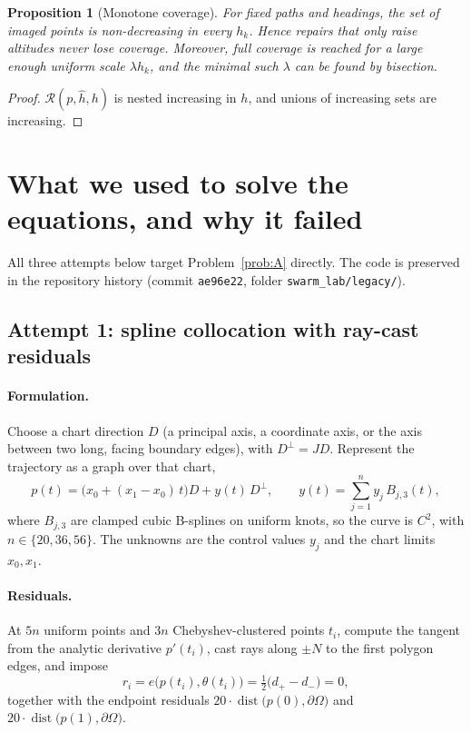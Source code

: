 \documentclass[11pt,a4paper]{article}
\numberwithin{equation}{section}
\theoremstyle{plain}
\newtheorem{proposition}{Proposition}[section]
\theoremstyle{definition}
\theoremstyle{remark}
\newcommand{\pO}{\partial\Omega}
\begin{document}
\begin{proposition}[Monotone coverage]\label{prop:monotone}
For fixed paths and headings, the set of imaged points is non-decreasing in every $h_k$. Hence repairs that only raise altitudes never lose coverage. Moreover, full coverage is reached for a large enough uniform scale $\lambda h_k$, and the minimal such $\lambda$ can be found by bisection.
\end{proposition}
\begin{proof}
$\mathcal R(p,\hat h,h)$ is nested increasing in $h$, and unions of increasing sets are increasing.
\end{proof}

\section{What we used to solve the equations, and why it failed}
\label{sec:attempts}

All three attempts below target Problem~\ref{prob:A} directly. The code is preserved in the repository history (commit \texttt{ae96e22}, folder \texttt{swarm\_lab/legacy/}).

\subsection{Attempt 1: spline collocation with ray-cast residuals}

\paragraph{Formulation.} Choose a chart direction $D$ (a principal axis, a coordinate axis, or the axis between two long, facing boundary edges), with $D^\perp=JD$. Represent the trajectory as a graph over that chart,
\begin{equation}
p(t)=\bigl(x_0+(x_1-x_0)\,t\bigr)D + y(t)\,D^\perp,\qquad y(t)=\sum_{j=1}^{n} y_j\,B_{j,3}(t),
\label{eq:chart}
\end{equation}
where $B_{j,3}$ are clamped cubic B-splines on uniform knots, so the curve is $C^2$, with $n\in\{20,36,56\}$. The unknowns are the control values $y_j$ and the chart limits $x_0,x_1$.

\paragraph{Residuals.} At $5n$ uniform points and $3n$ Chebyshev-clustered points $t_i$, compute the tangent from the analytic derivative $p'(t_i)$, cast rays along $\pm N$ to the first polygon edges, and impose
\begin{equation}
r_i = e\bigl(p(t_i),\theta(t_i)\bigr) = \tfrac12\bigl(d_+-d_-\bigr)=0,
\label{eq:attempt1}
\end{equation}
together with the endpoint residuals $20\cdot\operatorname{dist}\bigl(p(0),\pO\bigr)$ and $20\cdot\operatorname{dist}\bigl(p(1),\pO\bigr)$.
\end{document}
